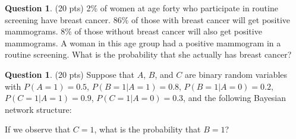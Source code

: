 \documentclass{article}
\theoremstyle{definition}
\newtheorem{question}[thm]{Question}
\begin{document}

\begin{question} (20 pts)
    2\% of women at age forty who participate in routine screening have breast cancer. 86\% of those with breast cancer will get positive mammograms. 8\% of those without breast cancer will also get positive mammograms. A woman in this age group had a positive mammogram in a routine screening. What is the probability that she actually has breast cancer?
\end{question}

\begin{question} (20 pts) Suppose that $A$, $B$, and $C$ are binary random variables with $P(A=1) = 0.5$, $P(B=1|A=1) = 0.8$, $P(B=1|A=0) = 0.2$, $P(C=1|A=1) = 0.9$, $P(C=1|A=0) = 0.3$, and the following Bayesian network structure:
    \begin{center}
    \end{center}
If we observe that $C=1$, what is the probability that $B=1$?
\end{question}
\end{document}
